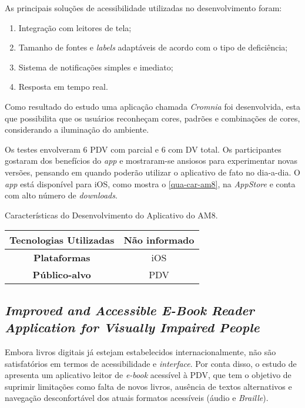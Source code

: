 As principais soluções de acessibilidade utilizadas no desenvolvimento foram:

\begin{enumerate}
  \item Integração com leitores de tela;
  \item Tamanho de fontes e \emph{labels} adaptáveis de acordo com o tipo de deficiência;
  \item Sistema de notificações simples e imediato;
  \item Resposta em tempo real.
\end{enumerate}

Como resultado do estudo uma aplicação chamada \emph{Cromnia} foi desenvolvida, esta que possibilita que os usuários reconheçam
cores, padrões e combinações de cores, considerando a iluminação do ambiente.

Os testes envolveram 6 PDV com parcial e 6 com DV total.
Os participantes gostaram dos benefícios do \emph{app} e mostraram-se ansiosos para experimentar novas versões,
pensando em quando poderão utilizar o aplicativo de fato no dia-a-dia.
O \emph{app} está disponível para iOS, como mostra o \autoref{qua-car-am8}, na \emph{AppStore}
e conta com alto número de \emph{downloads}.

\begin{quadro}[htb!]
  \caption{\label{qua-car-am8}Características do Desenvolvimento do Aplicativo do AM8.}
  \begin{tabular}{|c|c|}
    \hline
    \textbf{Tecnologias Utilizadas} & Não informado \\ \hline
    \textbf{Plataformas}            & iOS           \\ \hline
    \textbf{Público-alvo}           & PDV           \\
    \hline
  \end{tabular}
\end{quadro}

\subsection{\emph{Improved and Accessible E-Book Reader Application for Visually Impaired People}}

Embora livros digitais já estejam estabelecidos internacionalmente, não são satisfatórios em termos de acessibilidade e \emph{interface}.
Por conta disso, o estudo de  apresenta um aplicativo leitor de \emph{e-book} acessível à PDV, que tem o objetivo
de suprimir limitações como falta de novos livros, ausência de textos alternativos e navegação desconfortável dos atuais formatos
acessíveis (áudio e \emph{Braille}).

